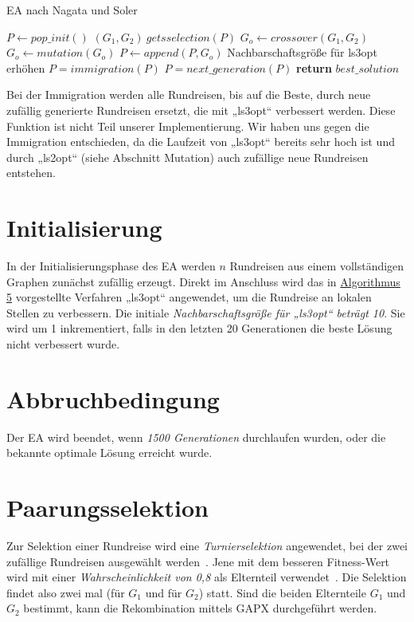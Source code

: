 \begin{algorithm}[H]
\caption{EA nach Nagata und Soler }\label{alg:ea}
\begin{algorithmic}[1]
    \State $P \gets pop\_init()$
      \State $(G_1, G_2) \ gets selection(P)$
      \State $G_o \gets crossover(G_1, G_2)$
        \State $G_o \gets mutation(G_o)$
      \EndIf
      \State $P \gets append(P, G_o)$
        \State Nachbarschaftsgröße für ls3opt erhöhen
        \State $P = immigration(P)$
      \EndIf
      \State $P = next\_generation(P)$
    \EndWhile
    \State \textbf{return} $best\_solution$
  \EndProcedure
\end{algorithmic}
\end{algorithm}
\begin{bem}
  Bei der Immigration werden alle Rundreisen, bis auf die Beste, durch
  neue zufällig generierte Rundreisen ersetzt, die mit „ls3opt“
  verbessert werden. Diese Funktion ist nicht
  Teil unserer Implementierung. Wir haben uns gegen die Immigration
  entschieden, da die Laufzeit von „ls3opt“ bereits sehr hoch ist und 
  durch „ls2opt“ (siehe Abschnitt Mutation) auch zufällige neue Rundreisen 
  entstehen.
\end{bem}
\section{Initialisierung}
In der Initialisierungsphase des EA werden $n$ Rundreisen aus einem
vollständigen Graphen zunächst zufällig erzeugt. Direkt im Anschluss
wird das in \hyperref[alg:ls3opt_run]{Algorithmus 5} vorgestellte Verfahren 
„ls3opt“ angewendet, um die
Rundreise an lokalen Stellen zu verbessern. Die initiale
\textit{Nachbarschaftsgröße für „ls3opt“ beträgt 10}. Sie wird um 1
inkrementiert, falls in den letzten 20 Generationen die beste Lösung
nicht verbessert wurde.
\section{Abbruchbedingung}
Der EA wird beendet, wenn \textit{1500 Generationen} durchlaufen wurden, oder
die bekannte optimale Lösung erreicht wurde. 
\section{Paarungsselektion}
Zur Selektion einer Rundreise wird eine \textit{Turnierselektion} angewendet, 
bei der zwei zufällige Rundreisen ausgewählt werden~\cite{weicker}. Jene mit dem
besseren Fitness-Wert wird mit einer \textit{Wahrscheinlichkeit von 0,8} als 
Elternteil verwendet~\cite{gapx}. Die Selektion findet also zwei mal 
(für $G_1$ und für $G_2$) statt. Sind die beiden Elternteile $G_1$ und
$G_2$ bestimmt, kann die Rekombination mittels GAPX durchgeführt werden.
